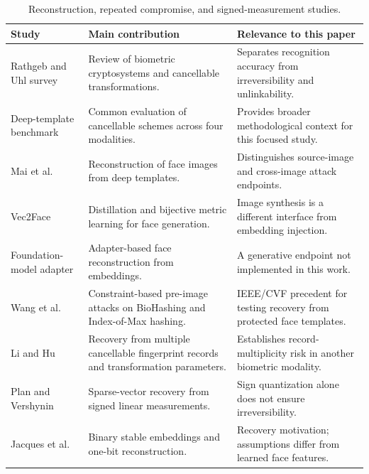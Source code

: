 \begin{table}[t]
\caption{Reconstruction, repeated compromise, and signed-measurement studies.}
\label{tab:review3}\centering\footnotesize
\begin{tabularx}{\textwidth}{@{}>{\raggedright\arraybackslash}p{3.1cm}>{\raggedright\arraybackslash}X>{\raggedright\arraybackslash}X@{}}\toprule
Study & Main contribution & Relevance to this paper \\ \midrule
Rathgeb and Uhl survey~\cite{rathgeb2011survey} & Review of biometric cryptosystems and cancellable transformations. & Separates recognition accuracy from irreversibility and unlinkability.\\[3pt]
Deep-template benchmark~\cite{benchmark2026} & Common evaluation of cancellable schemes across four modalities. & Provides broader methodological context for this focused study.\\[3pt]
Mai et al.~\cite{mai2019reconstruction} & Reconstruction of face images from deep templates. & Distinguishes source-image and cross-image attack endpoints.\\[3pt]
Vec2Face~\cite{vec2face} & Distillation and bijective metric learning for face generation. & Image synthesis is a different interface from embedding injection.\\[3pt]
Foundation-model adapter~\cite{shahreza2024adapter} & Adapter-based face reconstruction from embeddings. & A generative endpoint not implemented in this work.\\[3pt]
Wang et al.~\cite{wang2021csa} & Constraint-based pre-image attacks on BioHashing and Index-of-Max hashing. & IEEE/CVF precedent for testing recovery from protected face templates.\\[3pt]
Li and Hu~\cite{li2014multiplicity} & Recovery from multiple cancellable fingerprint records and transformation parameters. & Establishes record-multiplicity risk in another biometric modality.\\[3pt]
Plan and Vershynin~\cite{plan2013} & Sparse-vector recovery from signed linear measurements. & Sign quantization alone does not ensure irreversibility.\\[3pt]
Jacques et al.~\cite{jacques2013} & Binary stable embeddings and one-bit reconstruction. & Recovery motivation; assumptions differ from learned face features.\\[3pt]
\bottomrule\end{tabularx}
\end{table}
